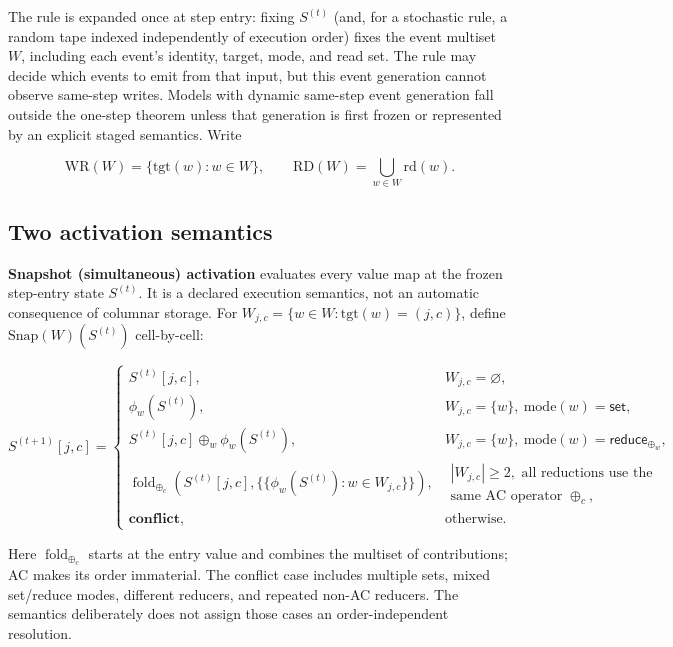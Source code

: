 \documentclass[sigconf,nonacm,review,natbib=true]{acmart}
\theoremstyle{definition}
\theoremstyle{plain}
\theoremstyle{remark}
\begin{document}
The rule is expanded once at step entry: fixing $S^{(t)}$ (and, for a
stochastic rule, a random tape indexed independently of execution order) fixes
the event multiset $W$, including each event's identity, target, mode, and read
set. The rule may decide which events to emit from that input, but this event
generation cannot observe same-step writes. Models with dynamic same-step event
generation fall outside the one-step theorem unless that generation is first
frozen or represented by an explicit staged semantics. Write

\[
\mathrm{WR}(W)=\{\mathrm{tgt}(w):w\in W\},\qquad
\mathrm{RD}(W)=\textstyle\bigcup_{w\in W}\mathrm{rd}(w).
\]


\subsection{Two activation semantics}\label{ax:sem}

\textbf{Snapshot (simultaneous) activation} evaluates every value map at the
frozen step-entry state $S^{(t)}$. It is a declared execution semantics, not an
automatic consequence of columnar storage. For
$W_{j,c}=\{w\in W:\mathrm{tgt}(w)=(j,c)\}$, define
$\mathrm{Snap}(W)(S^{(t)})$ cell-by-cell:

\[
S^{(t+1)}[j,c]=
\begin{cases}
S^{(t)}[j,c], & W_{j,c}=\varnothing,\\[2pt]
\phi_w(S^{(t)}), & W_{j,c}=\{w\},\ \mathrm{mode}(w)=\textsf{set},\\[2pt]
S^{(t)}[j,c]\oplus_w\phi_w(S^{(t)}),
  & W_{j,c}=\{w\},\ \mathrm{mode}(w)=\textsf{reduce}_{\oplus_w},\\[2pt]
\operatorname{fold}_{\oplus_c}\!\left(S^{(t)}[j,c],
  \{\!\{\phi_w(S^{(t)}):w\in W_{j,c}\}\!\}\right),
  & \begin{array}{l}|W_{j,c}|\ge2,\text{ all reductions use the}\\[-1pt]
    \text{same AC operator }\oplus_c,\end{array}\\[5pt]
\textbf{conflict}, & \text{otherwise.}
\end{cases}
\]

Here $\operatorname{fold}_{\oplus_c}$ starts at the entry value and combines the
multiset of contributions; AC makes its order immaterial. The conflict case
includes multiple \textsf{set}s, mixed \textsf{set}/\textsf{reduce} modes,
different reducers, and repeated non-AC reducers. The semantics deliberately
does not assign those cases an order-independent resolution.
\end{document}
